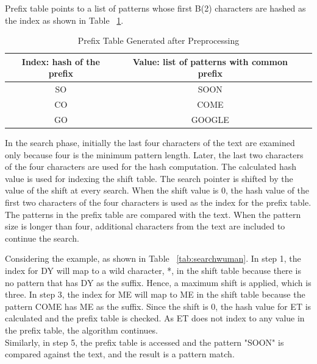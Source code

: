 Prefix table points to a list of patterns whose first B(2) characters are hashed as the index as shown in Table ~\ref{tab:prefix}.

\begin{table}[H]
\centering
\caption {Prefix Table Generated after Preprocessing} \label{tab:prefix}
\begin{tabular}{|c|c|c|}
\midrule
Index: hash of the prefix & Value: list of patterns with common prefix \\
\midrule
SO & SOON  \\
\midrule
CO & COME  \\
\midrule
GO & GOOGLE  \\
\midrule
\end{tabular}
\end{table}
\squeezeup

In the search phase, initially the last four characters of the text are examined only because four is the minimum pattern length. Later, the last two characters of the four characters are used for the hash computation. The calculated hash value is used for indexing the shift table. The search pointer is shifted by the value of the shift at every search. When the shift value is 0, the hash value of the first two characters of the four characters is used as the index for the prefix table. The patterns in the prefix table are compared with the text. When the pattern size is longer than four, additional characters from the text are included to continue the search. 

Considering the example, as shown in Table ~\ref{tab:searchwuman}. In step 1, the index for DY will map to a wild character, *, in the shift table  because there is no pattern that has DY as the suffix. Hence, a maximum shift is applied, which is three. In step 3, the index for ME will map to ME in the shift table because the pattern COME has ME as the suffix. Since the shift is 0, the hash value for ET is calculated and the prefix table is checked. As ET does not index to any value in the prefix table, the algorithm continues. \\ Similarly, in step 5, the prefix table is accessed and the pattern "SOON" is compared against the text, and the result is a pattern match. 

